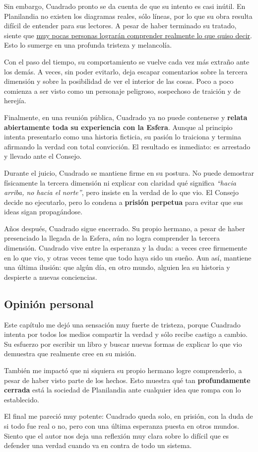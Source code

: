 \documentclass{article}
\begin{document}
Sin embargo, Cuadrado pronto se da cuenta de que su intento es casi inútil. En Planilandia no existen los diagramas reales, sólo líneas, por lo que su obra resulta difícil de entender para sus lectores. A pesar de haber terminado su tratado, siente que \underline{muy pocas personas lograrán comprender realmente lo que quiso decir}. Esto lo sumerge en una profunda tristeza y melancolía.

Con el paso del tiempo, su comportamiento se vuelve cada vez más extraño ante los demás. A veces, sin poder evitarlo, deja escapar comentarios sobre la tercera dimensión y sobre la posibilidad de ver el interior de las cosas. Poco a poco comienza a ser visto como un personaje peligroso, sospechoso de traición y de herejía.

Finalmente, en una reunión pública, Cuadrado ya no puede contenerse y \textbf{relata abiertamente toda su experiencia con la Esfera}. Aunque al principio intenta presentarlo como una historia ficticia, su pasión lo traiciona y termina afirmando la verdad con total convicción. El resultado es inmediato: es arrestado y llevado ante el Consejo.

Durante el juicio, Cuadrado se mantiene firme en su postura. No puede demostrar físicamente la tercera dimensión ni explicar con claridad qué significa \emph{“hacia arriba, no hacia el norte”}, pero insiste en la verdad de lo que vio. El Consejo decide no ejecutarlo, pero lo condena a \textbf{prisión perpetua} para evitar que sus ideas sigan propagándose.

Años después, Cuadrado sigue encerrado. Su propio hermano, a pesar de haber presenciado la llegada de la Esfera, aún no logra comprender la tercera dimensión. Cuadrado vive entre la esperanza y la duda: a veces cree firmemente en lo que vio, y otras veces teme que todo haya sido un sueño. Aun así, mantiene una última ilusión: que algún día, en otro mundo, alguien lea su historia y despierte a nuevas conciencias.

\subsection*{Opinión personal}

Este capítulo me dejó una sensación muy fuerte de tristeza, porque Cuadrado intenta por todos los medios compartir la verdad y sólo recibe castigo a cambio. Su esfuerzo por escribir un libro y buscar nuevas formas de explicar lo que vio demuestra que realmente cree en su misión.

También me impactó que ni siquiera su propio hermano logre comprenderlo, a pesar de haber visto parte de los hechos. Esto muestra qué tan \textbf{profundamente cerrada} está la sociedad de Planilandia ante cualquier idea que rompa con lo establecido.

El final me pareció muy potente: Cuadrado queda solo, en prisión, con la duda de si todo fue real o no, pero con una última esperanza puesta en otros mundos. Siento que el autor nos deja una reflexión muy clara sobre lo difícil que es defender una verdad cuando va en contra de todo un sistema.
\end{document}
